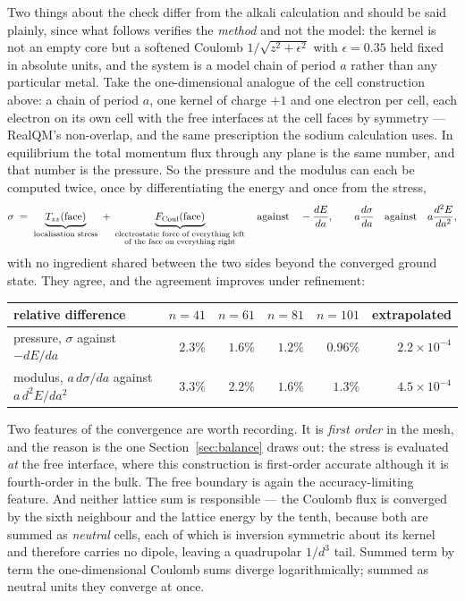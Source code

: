 \documentclass[11pt]{article}
\begin{document}
Two things about the check differ from the alkali calculation and should be said plainly, since
what follows verifies the \emph{method} and not the model: the kernel is not an empty core but a
softened Coulomb $1/\sqrt{z^2+\epsilon^2}$ with $\epsilon=0.35$ held fixed in absolute units, and the
system is a model chain of period $a$ rather than any particular metal. Take the one-dimensional
analogue of the cell construction above: a chain of period $a$,
one kernel of charge $+1$ and one electron per cell, each electron on its own cell with the free
interfaces at the cell faces by symmetry --- RealQM's non-overlap, and the same prescription the
sodium calculation uses. In equilibrium the total momentum flux through any plane is the same
number, and that number is the pressure. So the pressure and the modulus can each be computed twice,
once by differentiating the energy and once from the stress,
\[
\sigma \;=\; \underbrace{T_{zz}(\text{face})}_{\text{localisation stress}}
 \;+\; \underbrace{F_{\rm Coul}(\text{face})}_{\substack{\text{electrostatic force of everything left}\\ \text{of the face on everything right}}}
\quad\text{against}\quad -\frac{dE}{da},
\qquad
a\frac{d\sigma}{da}\quad\text{against}\quad a\frac{d^2E}{da^2},
\]
with no ingredient shared between the two sides beyond the converged ground state. They agree, and
the agreement improves under refinement:
\begin{center}
\begin{tabular}{lrrrrr}
\toprule
relative difference & $n=41$ & $n=61$ & $n=81$ & $n=101$ & extrapolated \\
\midrule
pressure, $\sigma$ against $-dE/da$        & $2.3\%$ & $1.6\%$ & $1.2\%$ & $0.96\%$ & $2.2\times10^{-4}$ \\
modulus, $a\,d\sigma/da$ against $a\,d^2E/da^2$ & $3.3\%$ & $2.2\%$ & $1.6\%$ & $1.3\%$ & $4.5\times10^{-4}$ \\
\bottomrule
\end{tabular}
\end{center}

Two features of the convergence are worth recording. It is \emph{first order} in the mesh, and the
reason is the one Section~\ref{sec:balance} draws out: the stress is evaluated \emph{at} the free
interface, where this construction is first-order accurate although it is fourth-order in the bulk.
The free boundary is again the accuracy-limiting feature. And neither lattice sum is responsible ---
the Coulomb flux is converged by the sixth neighbour and the lattice energy by the tenth, because
both are summed as \emph{neutral} cells, each of which is inversion symmetric about its kernel and
therefore carries no dipole, leaving a quadrupolar $1/d^3$ tail. Summed term by term the
one-dimensional Coulomb sums diverge logarithmically; summed as neutral units they converge at once.
\end{document}
